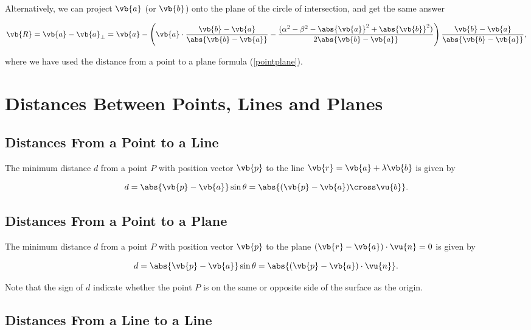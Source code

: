 \documentclass[a4paper,12pt]{report}
\begin{document}
{Alternatively, we can project \(\vb{a} \) (or \(\vb{b} \)) onto the plane of the circle of intersection, and get the same answer 

\begin{equation}
    \vb{R} = \vb{a} - \vb{a} _{\perp } = \vb{a} - \left( \vb{a} \cdot \frac{\vb{b} -\vb{a} }{\abs{\vb{b} -\vb{a} } } -\frac{(\alpha ^2-\beta ^2 - \abs{\vb{a} }^2 + \abs{\vb{b} }^2)}{2\abs{\vb{b} -\vb{a} } }  \right) \frac{\vb{b} -\vb{a} }{\abs{\vb{b} -\vb{a} } },
\end{equation}

where we have used the distance from a point to a plane formula (\cref{pointplane}).
} 


\section{Distances Between Points, Lines and Planes}

\subsection{Distances From a Point to a Line}

The minimum distance \(d\) from a point \(P\) with position vector \(\vb{p} \) to the line \(\vb{r} = \vb{a} + \lambda \vb{b} \) is given by 

\begin{equation}
    d = \abs{\vb{p} -\vb{a} }\sin \theta = \abs{(\vb{p} -\vb{a} )\cross \vu{b}  }. 
\end{equation}

\subsection{Distances From a Point to a Plane}

The minimum distance \(d\) from a point \(P\) with position vector \(\vb{p} \) to the plane \((\vb{r} - \vb{a} )\cdot \vu{n} = 0\)  is given by 

\begin{equation}
    d = \abs{\vb{p} - \vb{a} }\sin \theta = \abs{(\vb{p} -\vb{a} )\cdot \vu{n} }  .  \label{pointplane} 
\end{equation}

Note that the sign of \(d\) indicate whether the point \(P\) is on the same or opposite side of the surface as the origin. 

\subsection{Distances From a Line to a Line}
\end{document}
